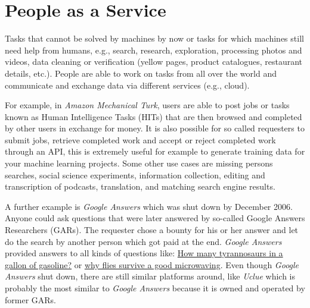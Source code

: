 \documentclass[a4paper]{article}
\begin{document}
\section{People as a Service}
Tasks that cannot be solved by machines by now or tasks for which machines still need help from humans,
e.g., search, research, exploration, processing photos and videos, data cleaning or verification (yellow pages, product catalogues, restaurant details, etc.).
People are able to work on tasks from all over the world and communicate and exchange data via different services (e.g., cloud).

For example, in \emph{Amazon Mechanical Turk}, users are able to post jobs or tasks known as Human Intelligence Tasks (HITs) that are then browsed and completed by other users in exchange for money.
It is also possible for so called requesters to submit jobs, retrieve completed work and accept or reject completed work through an API, this is extremely useful for example to generate training data for your machine learning projects.
Some other use cases are missing persons searches, social science experiments, information collection, editing and transcription of podcasts, translation, and matching search engine results.

A further example is \emph{Google Answers} which was shut down by December 2006. Anyone could ask questions that were later answered by so-called Google Answers Researchers (GARs).
The requester chose a bounty for his or her answer and let do the search by another person which got paid at the end.
\emph{Google Answers} provided answers to all kinds of questions like: \href{http://answers.google.com/answers/threadview?id=6021}{How many tyrannosaurs in a gallon of gasoline?} or \href{http://answers.google.com/answers/threadview?id=265489}{why flies survive a good microwaving}.
Even though \emph{Google Answers} shut down, there are still similar platforms around, like \emph{Uclue} which is probably the most similar to \emph{Google Answers} because it is owned and operated by former GARs. 
\end{document}
